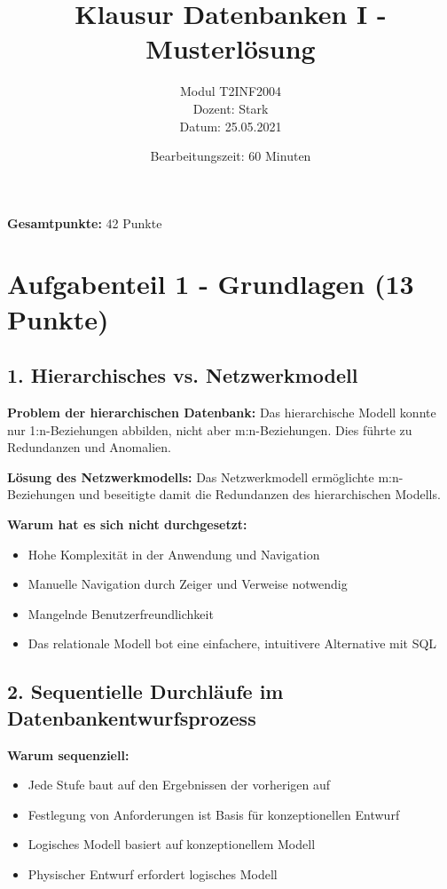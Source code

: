 \documentclass[12pt,a4paper]{article}
\title{\textbf{Klausur Datenbanken I - Musterlösung}}
\author{Modul T2INF2004 \\[0.3cm] Dozent: Stark \\[0.3cm] Datum: 25.05.2021}
\date{Bearbeitungszeit: 60 Minuten}
\begin{document}
\maketitle
\vspace{1cm}

\noindent
\textbf{Gesamtpunkte:} 42 Punkte

\vspace{1.5cm}

\section*{Aufgabenteil 1 - Grundlagen (13 Punkte)}

\subsection*{1. Hierarchisches vs. Netzwerkmodell}

\textbf{Problem der hierarchischen Datenbank:}
Das hierarchische Modell konnte nur 1:n-Beziehungen abbilden, nicht aber m:n-Beziehungen. Dies führte zu Redundanzen und Anomalien.

\textbf{Lösung des Netzwerkmodells:}
Das Netzwerkmodell ermöglichte m:n-Beziehungen und beseitigte damit die Redundanzen des hierarchischen Modells.

\textbf{Warum hat es sich nicht durchgesetzt:}
\begin{itemize}
    \item Hohe Komplexität in der Anwendung und Navigation
    \item Manuelle Navigation durch Zeiger und Verweise notwendig
    \item Mangelnde Benutzerfreundlichkeit
    \item Das relationale Modell bot eine einfachere, intuitivere Alternative mit SQL
\end{itemize}

\subsection*{2. Sequentielle Durchläufe im Datenbankentwurfsprozess}

\textbf{Warum sequenziell:}
\begin{itemize}
    \item Jede Stufe baut auf den Ergebnissen der vorherigen auf
    \item Festlegung von Anforderungen ist Basis für konzeptionellen Entwurf
    \item Logisches Modell basiert auf konzeptionellem Modell
    \item Physischer Entwurf erfordert logisches Modell
\end{itemize}
\end{document}
